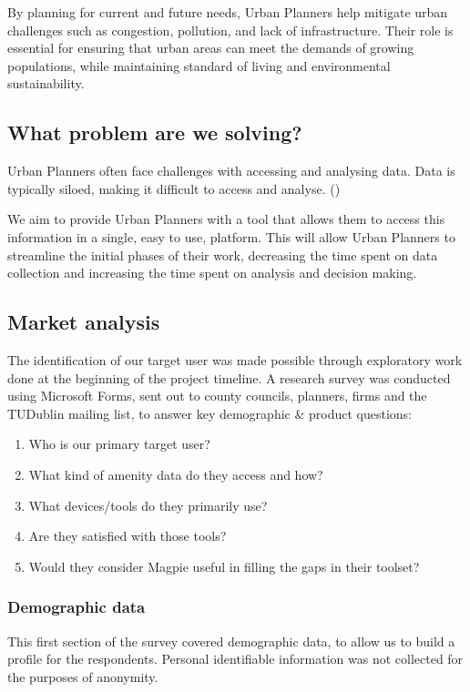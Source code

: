 By planning for current and future needs, Urban Planners help mitigate urban
challenges such as congestion, pollution, and lack of infrastructure. Their role
is essential for ensuring that urban areas can meet the demands of growing
populations, while maintaining standard of living and environmental
sustainability.

\subsection{What problem are we solving?}
Urban Planners often face challenges with accessing and analysing data. Data is
typically siloed, making it difficult to access and analyse.
(\cite{duivenvoorden2021managing})

We aim to provide Urban Planners with a tool that allows them to access this
information in a single, easy to use, platform. This will allow Urban Planners
to streamline the initial phases of their work, decreasing the time spent on
data collection and increasing the time spent on analysis and decision making.

\subsection{Market analysis}
The identification of our target user was made possible through exploratory work
done at the beginning of the project timeline. A research survey was conducted
using Microsoft Forms, sent out to county councils, planners, firms and the
TUDublin mailing list, to answer key demographic \& product questions:
\begin{enumerate}
    \item{Who is our primary target user?}
    \item{What kind of amenity data do they access and how?}
    \item{What devices/tools do they primarily use?}
    \item{Are they satisfied with those tools?}
    \item{Would they consider Magpie useful in filling the gaps in their toolset?}
\end{enumerate}

\newpage{}

\subsubsection{Demographic data}
This first section of the survey covered demographic data, to allow us to build a profile for the respondents. Personal identifiable information was not collected for the purposes of anonymity.

